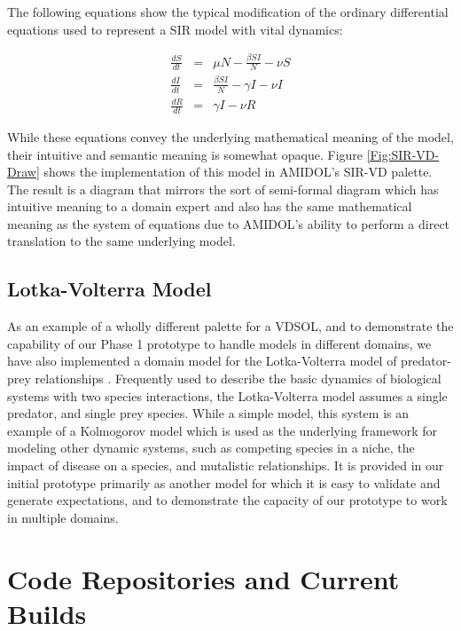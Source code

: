 \documentclass[11pt]{article}
\newcommand{\amidol}{\textsc{AMIDOL}}
\begin{document}
The following equations show the typical modification of the ordinary differential equations used to represent a SIR model with vital dynamics:

\begin{eqnarray}
  \frac{dS}{dt} &=& \mu N - \frac{\beta S I }{N} - \nu S\\
  \frac{dI}{dt} &=& \frac{\beta S I}{N} - \gamma I - \nu I\\
  \frac{dR}{dt} &=& \gamma I - \nu R
\end{eqnarray}

While these equations convey the underlying mathematical meaning of the model, their intuitive and semantic meaning is somewhat opaque.  Figure \ref{Fig:SIR-VD-Draw} shows the implementation of this model in \amidol{}'s SIR-VD palette.  The result is a diagram that mirrors the sort of semi-formal diagram which has intuitive meaning to a domain expert and also has the same mathematical meaning as the system of equations due to \amidol{}'s ability to perform a direct translation to the same underlying model.

\subsection{Lotka-Volterra Model}

As an example of a wholly different palette for a VDSOL, and to demonstrate the capability of our Phase 1 prototype to handle models in different domains, we have also implemented a domain model for the Lotka-Volterra model of predator-prey relationships \cite{freedman1980deterministic,brauer2012mathematical,hoppensteadt2006predator}.  Frequently used to describe the basic dynamics of biological systems with two species interactions, the Lotka-Volterra model assumes a single predator, and single prey species.  While a simple model, this system is an example of a Kolmogorov model which is used as the underlying framework for modeling other dynamic systems, such as competing species in a niche, the impact of disease on a species, and mutalistic relationships.  It is provided in our initial prototype primarily as another model for which it is easy to validate and generate expectations, and to demonstrate the capacity of our prototype to work in multiple domains.

\section{Code Repositories and Current Builds}
\end{document}
